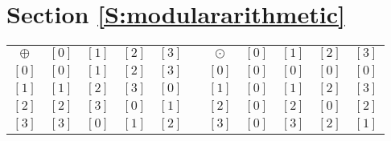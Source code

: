 \section*{Section \ref{S:modulararithmetic}}

\begin{list}{\bf{\ref{exer:sec74-modtables}.}}
\item \begin{list}{\bf{(a)}}
\item
\begin{tabular}{ c | c  c  c  c  p{0.5in} c | c  c  c  c}
$\oplus$ & $[ 0 ]$ & $[ 1 ]$ & $[ 2 ]$ & $[ 3 ]$ & 
  & $\odot$ & $[ 0 ]$ & $[ 1 ]$ & $[ 2 ]$ & $[ 3 ]$   \\ \cline{1-5} \cline{7-11}

$[ 0 ]$ & $[ 0 ]$ & $[ 1 ]$ & $[ 2 ]$ & 
$[ 3 ]$ & & $[ 0 ]$ & $[ 0 ]$ & 
$[ 0 ]$ & $[ 0 ]$ & $[ 0 ]$  
\\ 

$[ 1 ]$ & $[ 1 ]$ & $[ 2 ]$ & $[ 3 ]$ & 
$[ 0 ]$ & & $[ 1 ]$ & $[ 0 ]$ & 
$[ 1 ]$ & $[ 2 ]$ & $[ 3 ]$ \\ 

$[ 2 ]$ & $[ 2 ]$ & $[ 3 ]$ & $[ 0 ]$ & 
$[ 1 ]$ & & $[ 2 ]$ & $[ 0 ]$ & 
$[ 2 ]$ & $[ 0 ]$ & $[ 2 ]$ \\ 

$[ 3 ]$ & $[ 3 ]$ & $[ 0 ]$ & $[ 1 ]$ & 
$[ 2 ]$ & & $[ 3 ]$ & $[ 0 ]$ & 
$[ 3 ]$ & $[ 2 ]$ & $[ 1 ]$ \\ 
\end{tabular}
\end{list}
\end{list}
\vskip6pt

